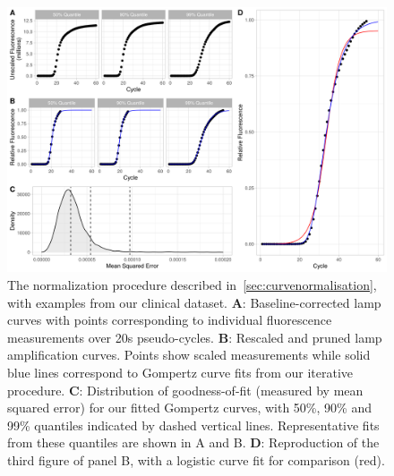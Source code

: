\documentclass[../thesis.tex]{subfiles}
\begin{document}
\begin{figure}[!tpb] 
\centering
\includegraphics[width=6in]{../figures/chapter2/paper_gomp_quality_fig.png}
\caption{The normalization procedure described in~\ref{sec:curvenormalisation}, with examples from our clinical dataset. \textbf{A}: Baseline-corrected \gls{lamp} curves with points corresponding to individual fluorescence measurements over 20s pseudo-cycles. \textbf{B}: Rescaled and pruned \gls{lamp} amplification curves. Points show scaled measurements while solid blue lines correspond to Gompertz curve fits from our iterative procedure. \textbf{C}: Distribution of goodness-of-fit (measured by mean squared error) for our fitted Gompertz curves, with 50\%, 90\% and 99\% quantiles indicated by dashed vertical lines. Representative fits from these quantiles are shown in {A} and {B}. \textbf{D}: Reproduction of the third figure of panel {B}, with a logistic curve fit for comparison (red).  \label{fig:gompertz_fit}}
\end{figure}
\end{document}
